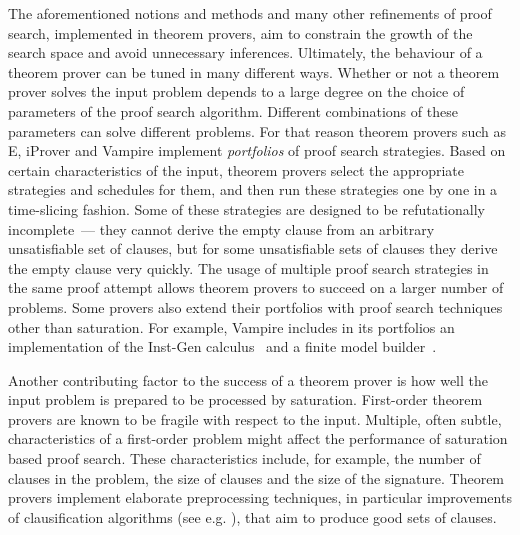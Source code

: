 

The aforementioned notions and methods and many other refinements of proof search, implemented in theorem provers, aim to constrain the growth of the search space and avoid unnecessary inferences. Ultimately, the behaviour of a theorem prover can be tuned in many different ways. Whether or not a theorem prover solves the input problem depends to a large degree on the choice of parameters of the proof search algorithm. Different combinations of these parameters can solve different problems. For that reason theorem provers such as E, iProver and Vampire implement \emph{portfolios} of proof search strategies. Based on certain characteristics of the input, theorem provers select the appropriate strategies and schedules for them, and then run these strategies one by one in a time-slicing fashion. Some of these strategies are designed to be refutationally incomplete~--- they cannot derive the empty clause from an arbitrary unsatisfiable set of clauses, but for some unsatisfiable sets of clauses they derive the empty clause very quickly. The usage of multiple proof search strategies in the same proof attempt allows theorem provers to succeed on a larger number of problems. Some provers also extend their portfolios with proof search techniques other than saturation. For example, Vampire includes in its portfolios an implementation of the Inst-Gen calculus~\cite{DBLP:conf/birthday/Korovin13} and a finite model builder~\cite{VampireFMB}.

Another contributing factor to the success of a theorem prover is how well the input problem is prepared to be processed by saturation. First-order theorem provers are known to be fragile with respect to the input. Multiple, often subtle, characteristics of a first-order problem might affect the performance of saturation based proof search. These characteristics include, for example, the number of clauses in the problem, the size of clauses and the size of the signature. Theorem provers implement elaborate preprocessing techniques, in particular improvements of clausification algorithms (see e.g. \cite{nonnengart2001computing,azmy2013computing,newcnf_fol}), that aim to produce good sets of clauses.

